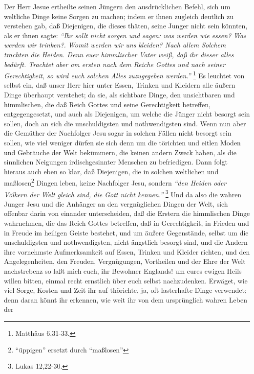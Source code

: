 Der Herr Jesue ertheilte seinen Jüngern den ausdrücklichen Befehl, sich um
weltliche Dinge keine Sorgen zu machen; indem er ihnen zugleich deutlich zu
verstehen gab, daß Diejenigen, die dieses thäten, seine Junger nicht sein
könnten, als er ihnen sagte:
\textit{"`Ihr sollt nicht sorgen und sagen: was werden wie
essen? Was werden wir trinken?. Womit werden wir uns kleiden? Nach allem Solchem
trachten die Heiden. Denn euer himmlischer Vater weiß, daß ihr dieser alles
bedürft. Trachtet aber am ersten nach dem Reiche Gottes und nach seiner
Gerechtigkeit, so wird euch solchen Alles zuzugegeben werden."'}
\footnote{Matthäus 6,31-33.}
Es leuchtet von selbst ein, daß unser Herr hier unter Essen,
Trinken und Kleidern alle äußern Dinge überhaupt verstehet; da sie, als
sichtbare Dinge, den unsichtbaren und himmlischen, die daß Reich Gottes und
seine Gerechtigkeit betreffen, entgegengesetzt, und auch als Diejenigen, um
welche die Jünger nicht besorgt sein sollen, doch an sich die unschuldigsten und
nothwendigsten sind. Wenn nun aber die Gemüther der Nachfolger Jesu sogar in
solchen Fällen nicht besorgt sein sollen, wie viel weniger dürfen sie sich denn
um die törichten und eitlen Moden und Gebräuche der Welt bekümmern, die keinen
andern Zweck haben, als die sinnlichen Neigungen irdischgesinnter Menschen zu
befriedigen. Dann folgt hieraus auch eben so klar, daß Diejenigen, die in
solchen weltlichen und maßlosen\footnote{"`üppigen"' ersetzt durch "`maßlosen"'} Dingen leben, keine Nachfolger Jesu, sondern
\textit{"`den Heiden oder Völkern der Welt gleich sind, die Gott nicht
kennen."'}
\footnote{Lukas 12,22-30.}
Und da also die wahren Junger Jesu und die
Anhänger an den vergnüglichen Dingen der Welt, sich offenbar darin von einander
unterscheiden, daß die Erstern die himmlischen Dinge wahrnehmen, die das Reich
Gottes betreffen, daß in Gerechtigkeit, in Frieden und in Freude im heiligen
Geiste bestehet, und um äußere Gegenstände, selbst um die unschuldigsten und
nothwendigsten, nicht ängstlich besorgt sind, und die Andern ihre vornehmste
Aufmerksamkeit auf Essen, Trinken und Kleider richten, und den Angelegenheiten,
den Freuden, Vergnügungen, Vortheilen und der Ehre der Welt nachstrebenz so laßt
mich euch, ihr Bewohner Englands! um eures ewigen Heils willen bitten, einmal
recht ernstlich über euch selbst nachzudenken. Erwäget, wie viel Sorge, Kosten
und Zeit ihr auf thörichte, ja, oft lasterhafte Dinge verwendet; denn daran
könnt ihr erkennen, wie weit ihr von dem ursprünglich wahren Leben der
